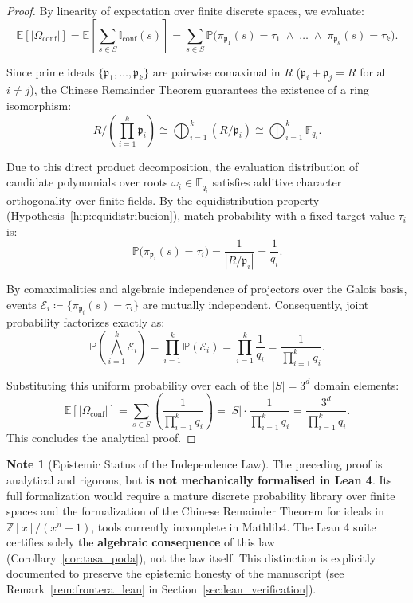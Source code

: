 \documentclass[11pt,a4paper]{article}
\theoremstyle{plain}
\theoremstyle{definition}
\newtheorem{remark}[teorema]{Note}
\numberwithin{equation}{section}
\newcommand{\ZZ}{\mathbb{Z}}
\newcommand{\FF}{\mathbb{F}}
\newcommand{\fkp}{\mathfrak{p}}
\newcommand{\E}{\mathbb{E}}
\newcommand{\Prob}{\mathbb{P}}
\begin{document}
\begin{proof}
By linearity of expectation over finite discrete spaces, we evaluate:
\begin{equation}
\E[|\Omega_{\text{conf}}|] = \E\left[ \sum_{s \in S} \mathbb{I}_{\text{conf}}(s) \right] = \sum_{s \in S} \Prob\Big( \pi_{\fkp_1}(s) = \tau_1 \;\land\; \dots \;\land\; \pi_{\fkp_k}(s) = \tau_k \Big).
\end{equation}

Since prime ideals $\{\fkp_1, \dots, \fkp_k\}$ are pairwise comaximal in $R$ ($\fkp_i + \fkp_j = R$ for all $i \neq j$), the Chinese Remainder Theorem guarantees the existence of a ring isomorphism:
\begin{equation}
R \Big/ \left( \prod_{i=1}^k \fkp_i \right) \cong \bigoplus_{i=1}^k \left( R / \fkp_i \right) \cong \bigoplus_{i=1}^k \FF_{q_i}.
\end{equation}

Due to this direct product decomposition, the evaluation distribution of candidate polynomials over roots $\omega_i \in \FF_{q_i}$ satisfies additive character orthogonality over finite fields. By the equidistribution property (Hypothesis~\ref{hip:equidistribucion}), match probability with a fixed target value $\tau_i$ is:
\begin{equation}
\Prob\big(\pi_{\fkp_i}(s) = \tau_i\big) = \frac{1}{|R/\fkp_i|} = \frac{1}{q_i}.
\end{equation}

By comaximalities and algebraic independence of projectors over the Galois basis, events $\mathcal{E}_i \coloneqq \{\pi_{\fkp_i}(s) = \tau_i\}$ are mutually independent. Consequently, joint probability factorizes exactly as:
\begin{equation}
\Prob\left( \bigwedge_{i=1}^k \mathcal{E}_i \right) = \prod_{i=1}^k \Prob(\mathcal{E}_i) = \prod_{i=1}^k \frac{1}{q_i} = \frac{1}{\prod_{i=1}^k q_i}.
\end{equation}

Substituting this uniform probability over each of the $|S| = 3^d$ domain elements:
\begin{equation}
\E[|\Omega_{\text{conf}}|] = \sum_{s \in S} \left( \frac{1}{\prod_{i=1}^k q_i} \right) = |S| \cdot \frac{1}{\prod_{i=1}^k q_i} = \frac{3^d}{\prod_{i=1}^k q_i}.
\end{equation}
This concludes the analytical proof.
\end{proof}

\begin{remark}[Epistemic Status of the Independence Law]
\label{rem:estatus_ley_independencia}
The preceding proof is analytical and rigorous, but \textbf{is not mechanically formalised in Lean 4}. Its full formalization would require a mature discrete probability library over finite spaces and the formalization of the Chinese Remainder Theorem for ideals in $\ZZ[x]/(x^n+1)$, tools currently incomplete in Mathlib4. The Lean 4 suite certifies solely the \textbf{algebraic consequence} of this law (Corollary~\ref{cor:tasa_poda}), not the law itself. This distinction is explicitly documented to preserve the epistemic honesty of the manuscript (see Remark~\ref{rem:frontera_lean} in Section~\ref{sec:lean_verification}).
\end{remark}
\end{document}
